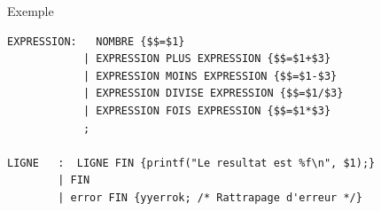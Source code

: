 
\begin{frame}[containsverbatim]{\ftitle}
\def\blocktitle{Exemple}
\begin{block}{\blocktitle}
\begin{verbatim}
EXPRESSION:	  NOMBRE {$$=$1}
			| EXPRESSION PLUS EXPRESSION {$$=$1+$3}
			| EXPRESSION MOINS EXPRESSION {$$=$1-$3}
			| EXPRESSION DIVISE EXPRESSION {$$=$1/$3}
			| EXPRESSION FOIS EXPRESSION {$$=$1*$3}			
			;

LIGNE	:  LIGNE FIN {printf("Le resultat est %f\n", $1);}
		| FIN
		| error FIN {yyerrok; /* Rattrapage d'erreur */}			
\end{verbatim}
\end{block}
\end{frame}


